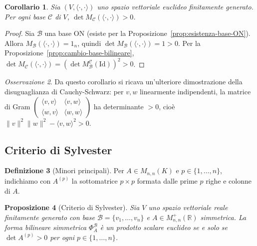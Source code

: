 \documentclass[11pt, a4paper]{book}
\theoremstyle{definition}
\newtheorem{definizione}{Definizione}[section]
\theoremstyle{plain}
\newtheorem{proposizione}[definizione]{Proposizione}
\newtheorem{corollario}[definizione]{Corollario}
\theoremstyle{remark}
\newtheorem{osservazione}[definizione]{Osservazione}
\newcommand{\R}{\mathbb{R}}
\newcommand{\Id}{\mathrm{Id}}
\begin{document}
\begin{corollario}
\label{cor:gram-det-positivo}
Sia $(V,\langle\cdot,\cdot\rangle)$ uno spazio vettoriale euclideo finitamente generato. Per ogni base $\mathcal{C}$ di $V$, $\det M_{\mathcal{C}}(\langle\cdot,\cdot\rangle) > 0$.
\end{corollario}

\begin{proof}
Sia $\mathcal{B}$ una base ON (esiste per la Proposizione~\ref{prop:esistenza-base-ON}). Allora $M_{\mathcal{B}}(\langle\cdot,\cdot\rangle) = 1_n$, quindi $\det M_{\mathcal{B}}(\langle\cdot,\cdot\rangle) = 1 > 0$. Per la Proposizione~\ref{prop:cambio-base-bilineare}, $\det M_{\mathcal{C}}(\langle\cdot,\cdot\rangle) = (\det M^{\mathcal{C}}_{\mathcal{B}}(\Id))^2 > 0$.
\end{proof}

\begin{osservazione}
Da questo corollario si ricava un'ulteriore dimostrazione della disuguaglianza di Cauchy-Schwarz: per $v,w$ linearmente indipendenti, la matrice di Gram $\begin{pmatrix}\langle v,v\rangle & \langle v,w\rangle\\\langle w,v\rangle & \langle w,w\rangle\end{pmatrix}$ ha determinante $>0$, cioè $\|v\|^2\|w\|^2 - \langle v,w\rangle^2 > 0$.
\end{osservazione}

\subsection{Criterio di Sylvester}

\begin{defbox}
\begin{definizione}[Minori principali]
Per $A \in M_{n,n}(K)$ e $p \in \{1,\ldots,n\}$, indichiamo con $A^{(p)}$ la sottomatrice $p \times p$ formata dalle prime $p$ righe e colonne di $A$.
\end{definizione}
\end{defbox}

\begin{proposizione}[Criterio di Sylvester]
\label{prop:sylvester}
Sia $V$ uno spazio vettoriale reale finitamente generato con base $\mathcal{B} = \{v_1,\ldots,v_n\}$ e $A \in M^+_{n,n}(\R)$ simmetrica. La forma bilineare simmetrica $\Phi^{\mathcal{B}}_A$ è un prodotto scalare euclideo se e solo se $\det A^{(p)} > 0$ per ogni $p \in \{1,\ldots,n\}$.
\end{proposizione}
\end{document}
